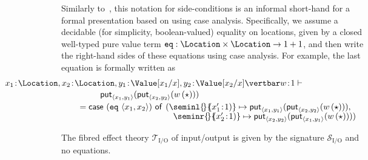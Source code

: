 Similarly to~\cite{Plotkin:HandlingEffects}, this notation for side-conditions is an informal short-hand for a formal presentation based on using case analysis. Specifically, we assume a decidable (for simplicity, boolean-valued) equality on locations, given by a closed well-typed pure value term  $ {\mathtt{eq}} : {\Location \times \Location \to 1 + 1}$, and then write the right-hand sides of these equations using case analysis. For example, the last equation is formally written as
\[
\begin{array}{c}
\hspace{-5cm}
{x_1 \!:\! \Location, x_2 \!:\! \Location, y_1 \!:\! \Value[x_1/x], y_2 \!:\! \Value[x_2/x] \vertbar w \!:\! 1} \vdash
\\[0.5mm]
\hspace{-5.35cm}
\mathsf{put}_{\langle x_1, y_1 \rangle}(\mathsf{put}_{\langle x_2, y_2 \rangle}(w\, (\star))) 
\\[1mm]
\hspace{0.1cm}
= \mathsf{case~} (\mathtt{eq}~ \langle x_1, x_2 \rangle) \mathsf{~of}_{} \mathsf{~} ({\seminl {\!} {\!\!(x'_1 \!:\! 1)} \mapsto \mathsf{put}_{\langle x_1, y_1 \rangle}(\mathsf{put}_{\langle x_2, y_2 \rangle}(w\, (\star)))}, 
\\[-0.5mm]
\hspace{4.2cm}
{\seminr {\!} {\!\!(x'_2 \!:\! 1)} \mapsto \mathsf{put}_{\langle x_2, y_2 \rangle}(\mathsf{put}_{\langle x_1, y_1 \rangle}(w\, (\star)))})
\end{array}
\]


\begin{example}
\label{ex:fibtheoryofIO}
The fibred effect theory $\mathcal{T}_{\text{I/O}}$ of input/output is given by the signature $\mathcal{S}_{\text{I/O}}$ and no equations.
\end{example}


